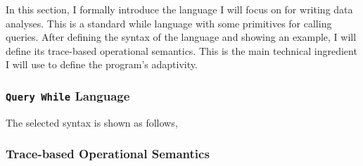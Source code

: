 In this section, I formally introduce the language I will focus on for writing data analyses.  
This is a standard while language with some primitives for calling queries. 
After defining the syntax of the language and showing an example, 
I will define its trace-based operational semantics. 
This is the main technical ingredient I will use to define the program's adaptivity.
\subsubsection{{\tt Query While} Language}
\label{sec:language-syntax}
The selected syntax is shown as follows,



\subsubsection{Trace-based Operational Semantics}
\label{sec:language-os}
